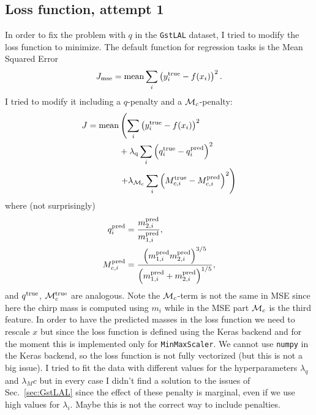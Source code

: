 \documentclass[prd,aps,twocolumn,a4paper,showkeys,nofootinbib]{revtex4-1}
\def\Mc{{\cal M}_c}
\begin{document}
\subsection{Loss function, attempt 1}
\label{sec:loss}
In order to fix the problem with $q$ in the \texttt{GstLAL} dataset, 
I tried to modify the loss function to minimize.
The default function for regression tasks is the Mean Squared Error
\begin{equation}
J_{\rm mse} = {\rm mean} \sum_i \left( y^{\rm true}_i - f(x_i) \right)^2 .
\end{equation}
I tried to modify it including a $q$-penalty and a $\Mc$-penalty:
\begin{align}
J =  {\rm mean} & \left(  \sum_i \left( y^{\rm true}_i - f(x_i) \right)^2 \right.   \nonumber \\
&  + \lambda_{\rm q} \sum_i \left( q^{\rm true}_i - q^{\rm pred}_i \right)^2
\nonumber \\
& \left. + \lambda_{\rm \Mc} \sum_i \left( M_{c,i}^{\rm true} - M_{c,i}^{\rm pred} \right)^2 \right)
\end{align}
where (not surprisingly)
\begin{align}
q^{\rm pred}_i &  = \frac{m_{2,i}^{\rm pred}}{m_{1,i}^{\rm pred}}, \\
M_{c,i}^{\rm pred} & = 
\frac{\left(m_{1,i}^{\rm pred}m_{2,i}^{\rm pred} \right)^{3/5}}{\left(m_{1,i}^{\rm pred}+m_{2,i}^{\rm pred}\right)^{1/5}},
\end{align}
and $q^{\rm true}$, $\Mc^{\rm true}$ are analogous. Note the $\Mc$-term is not the same 
in MSE since here the chirp mass is computed using $m_i$ while in the MSE part $\Mc$ 
is the third feature.
In order to have the predicted masses in the loss function we need to 
rescale $x$ but since the loss function is defined using the Keras backend and 
for the moment this is implemented only for  \texttt{MinMaxScaler}. 
We cannot use \texttt{numpy} in the Keras backend, so the loss function is not fully vectorized
(but this is not a big issue). 
I tried to fit the data with different values for the hyperparameters $\lambda_q$ and
$\lambda_Mc$ but in every case I didn't find a solution to the issues of Sec.~\ref{sec:GstLAL}
since the effect of these penalty is marginal, even if we use high values for $\lambda_i$.
Maybe this is not the correct way to include penalties. 

\end{document}
